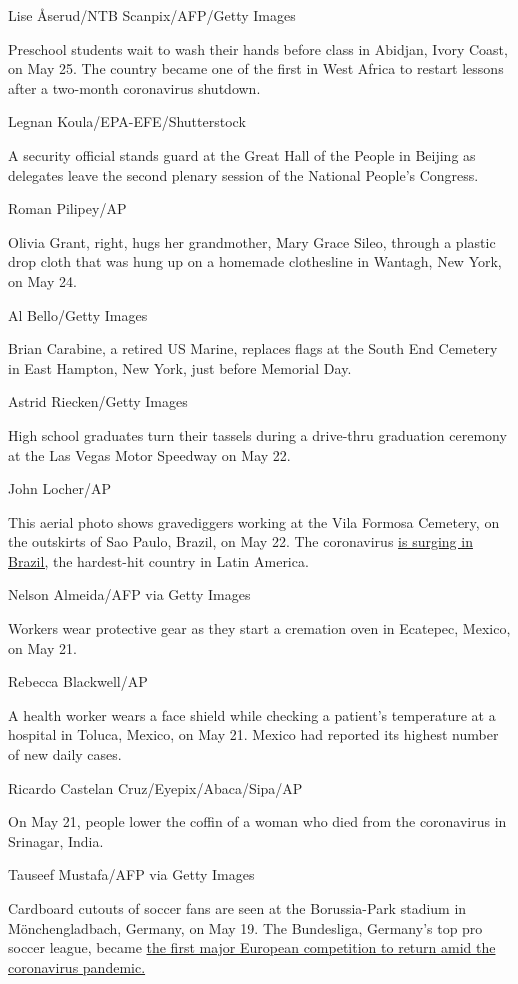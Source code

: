 Lise Åserud/NTB Scanpix/AFP/Getty Images

Preschool students wait to wash their hands before class in Abidjan,
Ivory Coast, on May 25. The country became one of the first in West
Africa to restart lessons after a two-month coronavirus shutdown.

Legnan Koula/EPA-EFE/Shutterstock

A security official stands guard at the Great Hall of the People in
Beijing as delegates leave the second plenary session of the National
People's Congress.

Roman Pilipey/AP

Olivia Grant, right, hugs her grandmother, Mary Grace Sileo, through a
plastic drop cloth that was hung up on a homemade clothesline in
Wantagh, New York, on May 24.

Al Bello/Getty Images

Brian Carabine, a retired US Marine, replaces flags at the South End
Cemetery in East Hampton, New York, just before Memorial Day.

Astrid Riecken/Getty Images

High school graduates turn their tassels during a drive-thru graduation
ceremony at the Las Vegas Motor Speedway on May 22.

John Locher/AP

This aerial photo shows gravediggers working at the Vila Formosa
Cemetery, on the outskirts of Sao Paulo, Brazil, on May 22. The
coronavirus
\href{https://www.cnn.com/2020/05/20/americas/brazil-coronavirus-deaths-intl/index.html}{is
surging in Brazil,} the hardest-hit country in Latin America.

Nelson Almeida/AFP via Getty Images

Workers wear protective gear as they start a cremation oven in Ecatepec,
Mexico, on May 21.

Rebecca Blackwell/AP

A health worker wears a face shield while checking a patient's
temperature at a hospital in Toluca, Mexico, on May 21. Mexico had
reported its highest number of new daily cases.

Ricardo Castelan Cruz/Eyepix/Abaca/Sipa/AP

On May 21, people lower the coffin of a woman who died from the
coronavirus in Srinagar, India.

Tauseef Mustafa/AFP via Getty Images

Cardboard cutouts of soccer fans are seen at the Borussia-Park stadium
in Mönchengladbach, Germany, on May 19. The Bundesliga, Germany's top
pro soccer league, became
\href{https://www.cnn.com/2020/05/16/sport/germany-bundesliga-return-football-spt-intl/index.html}{the
first major European competition to return amid the coronavirus
pandemic.}

